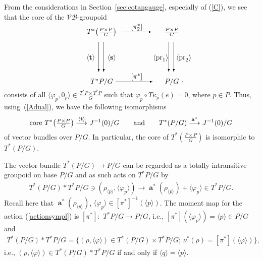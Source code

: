 \documentclass[pdftex]{sigma}
\newcommand{\Ss}{\textbf{s}}
\newcommand{\Tt}{\textbf{t}}
\renewcommand{\to}{\rightarrow}
\DeclareMathOperator{\anch}{\mathbf{a}}
\DeclareMathOperator{\core}{\text{\upshape core}\,}
\numberwithin{equation}{section}
\begin{document}
From the considerations in Section~\ref{sec:cotangauge}, especially of (\ref{C}), we see that the core of the $\mathcal{V}\!\mathcal{B}$-groupoid
\begin{gather*}%
\begin{split}& \unitlength=5mm\begin{picture}(11,5.6)(-2,0)
 \put(1,5){\makebox(0,0){$T^*\big(\frac{P\times P}{G}\big)$}}
 \put(8,5){\makebox(0,0){$\frac{P\times P}{G}$}}
 \put(1,0){\makebox(0,0){$T^*P/G$}}
 \put(8,0){\makebox(0,0){$P/G$}}
 \put(1.2,4){\vector(0,-1){3}}
 \put(0.7,4){\vector(0,-1){3}}
 \put(8.2,4){\vector(0,-1){3}}
 \put(7.7,4){\vector(0,-1){3}}
 \put(3,5){\vector(1,0){3}}
 \put(2.4,0){\vector(1,0){3.7}}
 \put(2,2.4){\makebox(0,0){$\langle\Ss\rangle$}}
 \put(9.2,2.4){\makebox(0,0){$\langle \operatorname{pr}_2\rangle$}}
 \put(-0.1,2.4){\makebox(0,0){$\langle\Tt\rangle$}}
 \put(6.9,2.4){\makebox(0,0){$\langle \operatorname{pr}_1\rangle$}}
 \put(4.5,5.5){\makebox(0,0){$[\pi^*_2] $}}
 \put(4.5,0.5){\makebox(0,0){$[\pi^*] $}}
 \end{picture},\end{split}\end{gather*}
consists of all $\langle\varphi_p,0_p\rangle\in \frac{T^*P\times T^*P}{G}$ such that $\varphi_p\circ T\kappa_p(e)=0$, where $p\in P$. Thus, using~(\ref{Adual}), we have the following isomorphisms
\begin{gather*}%
\core T^*\big(\tfrac{P\times P}{G}\big)\stackrel{\langle\Tt\rangle}{\longrightarrow}J^{-1}(0)/G\qquad {\rm and}\qquad T^*(P/G)\stackrel{\anch^*}{\longrightarrow}J^{-1}(0)/G
\end{gather*}
of vector bundles over $P/G$. In particular, the core of $T^*(\tfrac{P\times P}{G})$ is isomorphic to $T^*(P/G)$.

The vector bundle $T^*(P/G)\to P/G$ can be regarded as a totally intransitive groupoid on base $P/G$ and as such acts on $T^*P/G$ by
\begin{gather}\label{actionsympl}
T^*(P/G)*T^*P/G\ni(\rho_{\langle p\rangle}, \langle\varphi_p\rangle)\to \anch^*(\rho_{\langle p\rangle})+ \langle\varphi_p\rangle\in T^*P/G.
\end{gather}
 Recall here that $ \anch^*(\rho_{\langle p\rangle})$, $\langle\varphi_p\rangle\in [\pi^*]^{-1}(\langle p\rangle)$. The moment map for the action (\ref{actionsympl}) is $[\pi^*]\colon$ $T^*P/G\to P/G$, i.e., $[\pi^*](\langle\varphi_p\rangle)=\langle p\rangle\in P/G$ and
 \begin{gather*} T^*(P/G)*T^*P/G=\{(\rho,\langle\varphi\rangle)\in T^*(P/G)\times T^*P/G;\, \nu^*(\rho)=[\pi^*](\langle\varphi\rangle)\},\end{gather*}
 i.e., $(\rho,\langle\varphi\rangle)\in T^*(P/G)* T^*P/G$ if and only if $\langle q\rangle=\langle p\rangle$.
\end{document}
